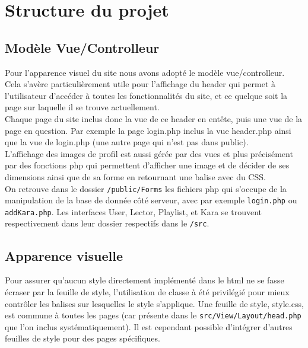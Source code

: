 \section{Structure du projet}
\subsection{Modèle Vue/Controlleur}
Pour l'apparence visuel du site nous avons adopté le modèle vue/controlleur. \\
Cela s'avère particulièrement utile pour l'affichage du header qui permet à l'utilisateur d'accéder à toutes les fonctionnalités du site, et ce quelque soit la page sur laquelle il se trouve actuellement.\\
Chaque page du site inclus donc la vue de ce header en entête, puis une vue de la page en question.
Par exemple la page login.php inclus la vue header.php ainsi que la vue de login.php (une autre page qui n'est pas dans public).\\
L'affichage des images de profil est aussi gérée par des vues et plus précisément par des fonctions php qui permettent d'afficher une image et de décider de ses dimensions ainsi que de sa forme en retournant une balise avec du CSS.\\
On retrouve dans le dossier \texttt{/public/Forms} les fichiers php qui s'occupe de la manipulation de la base de donnée côté serveur, avec par exemple \texttt{login.php} ou \texttt{addKara.php}.\newline
Les interfaces User, Lector, Playlist, et Kara se trouvent respectivement dans leur dossier respectifs dans le \texttt{/src}.


\subsection{Apparence visuelle}
Pour assurer qu'aucun style directement implémenté dans le html ne se fasse écraser par la feuille de style, l'utilisation de classe à été privilégié pour mieux contrôler les balises sur lesquelles le style s'applique. Une feuille de style, style.css, est commune à toutes les pages (car présente dans le \texttt{src/View/Layout/head.php} que l'on inclus systématiquement). Il est cependant possible d'intégrer d'autres feuilles de style pour des pages spécifiques.

